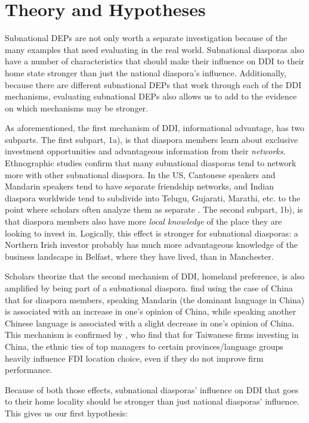 \documentclass[doublespace,nopageskip]{UVAthesis}
\begin{document}
\section{Theory and Hypotheses} \label{ss:subnational deps and ddi}

Subnational DEPs are not only worth a separate investigation because of the many examples that need evaluating in the real world. Subnational diasporas also have a number of characteristics that should make their influence on DDI to their home state stronger than just the national diaspora's influence. Additionally, because there are different subnational DEPs that work through each of the DDI mechanisms, evaluating subnational DEPs also allows us to add to the evidence on which mechanisms may be stronger.

As aforementioned, the first mechanism of DDI, informational advantage, has two subparts. The first subpart, 1a), is that diaspora members learn about exclusive investment opportunities and advantageous information from their \textit{networks}. Ethnographic studies confirm that many subnational diasporas tend to network more with other subnational diaspora. In the US, Cantonese speakers and Mandarin speakers tend to have separate friendship networks, and Indian diaspora worldwide tend to subdivide into Telugu, Gujarati, Marathi, etc. to the point where scholars often analyze them as separate \citet{yan_subethnic_2019, sahoo_issues_2006}. The second subpart, 1b), is that diaspora members also have more \textit{local knowledge} of the place they are looking to invest in. Logically, this effect is stronger for subnational diasporas: a Northern Irish investor probably has much more advantageous knowledge of the business landscape in Belfast, where they have lived, than in Manchester.

Scholars theorize that the second mechanism of DDI, homeland preference, is also amplified by being part of a subnational diaspora. \citet{xu_languages_2026} find using the case of China that for diaspora members, speaking Mandarin (the dominant language in China) is associated with an increase in one's opinion of China, while speaking another Chinese language is associated with a slight decrease in one's opinion of China. This mechanism is confirmed by \citep{jean_ethnic_2011}, who find that for Taiwanese firms investing in China, the ethnic ties of top managers to certain provinces/language groups heavily influence FDI location choice, even if they do not improve firm performance.

Because of both those effects, subnational diasporas' influence on DDI that goes to their home locality should be stronger than just national diasporas' influence. This gives us our first hypothesis:
\end{document}
